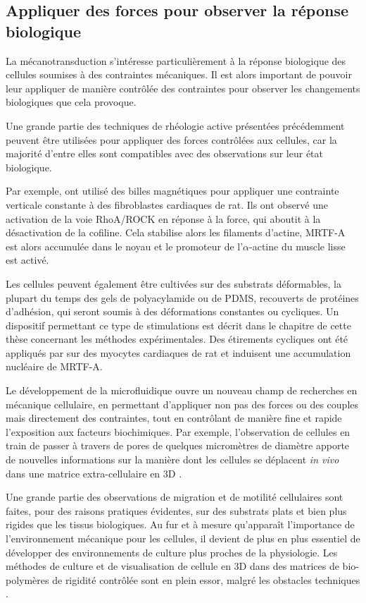 \subsection{Appliquer des forces pour observer la réponse biologique}

La mécanotransduction s'intéresse particulièrement à la réponse biologique des cellules soumises à des contraintes mécaniques. 
Il est alors important de pouvoir leur appliquer de manière contrôlée des contraintes pour observer les changements biologiques que cela provoque. 

Une grande partie des techniques de rhéologie active présentées précédemment peuvent être utilisées pour appliquer des forces contrôlées aux cellules, car la majorité d'entre elles sont compatibles avec des observations sur leur état biologique.

Par exemple,\cite{zhao_force_2007} ont utilisé des billes magnétiques pour appliquer une contrainte verticale constante à des fibroblastes cardiaques de rat. Ils ont observé une activation de la voie RhoA/ROCK en réponse à la force, qui aboutit à la désactivation de la cofiline. Cela stabilise alors les filaments d'actine, MRTF-A est alors accumulée dans le noyau et le promoteur de l'$\alpha$-actine  du muscle lisse est activé. 

Les cellules peuvent également être cultivées sur des substrats déformables, la plupart du temps des gels de polyacylamide ou de PDMS, recouverts de protéines d'adhésion, qui seront soumis à des déformations constantes ou cycliques. Un dispositif permettant ce type de stimulations est décrit dans le chapitre de cette thèse concernant les méthodes expérimentales. 
Des étirements cycliques ont été appliqués par \cite{kuwahara_myocardin-related_2010} sur des myocytes cardiaques de rat et induisent une accumulation nucléaire de MRTF-A.  


Le développement de la microfluidique ouvre un nouveau champ de recherches en mécanique cellulaire, en permettant d'appliquer non pas des forces ou des couples mais directement des contraintes, tout en contrôlant de manière fine et rapide l'exposition aux facteurs biochimiques. 
Par exemple, l'observation de cellules en train de passer à travers de pores de quelques micromètres de diamètre apporte de nouvelles informations sur la manière dont les cellules se déplacent \textit{in vivo} dans une matrice extra-cellulaire en 3D \parencite{aubry_computational_2015}. 

Une grande partie des observations de migration et de motilité cellulaires sont faites, pour des raisons pratiques évidentes, sur des substrats plats et bien plus rigides que les tissus biologiques. Au fur et à mesure qu'apparaît l'importance de l'environnement mécanique pour les cellules, il devient de plus en plus essentiel de développer des environnements de culture plus proches de la physiologie. Les méthodes de culture et de visualisation de cellule en 3D dans des matrices de bio-polymères de rigidité contrôlée sont en plein essor, malgré les obstacles techniques \parencite{fischer_stiffness-controlled_2012}. 
%
%